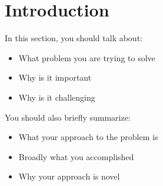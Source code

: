 \chapter{Introduction}

In this section, you should talk about:
\begin{itemize}
    \item What problem you are trying to solve
    \item Why is it important
    \item Why is it challenging
\end{itemize}
You should also briefly summarize:
\begin{itemize}
    \item What your approach to the problem is
    \item Broadly what you accomplished
    \item Why your approach is novel
\end{itemize}